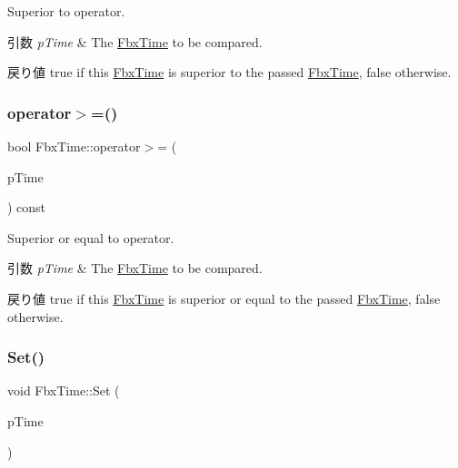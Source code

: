 Superior to operator. 
\begin{DoxyParams}{引数}
{\em p\+Time} & The \hyperlink{class_fbx_time}{Fbx\+Time} to be compared. \\
\hline
\end{DoxyParams}
\begin{DoxyReturn}{戻り値}
{\ttfamily true} if this \hyperlink{class_fbx_time}{Fbx\+Time} is superior to the passed \hyperlink{class_fbx_time}{Fbx\+Time}, {\ttfamily false} otherwise. 
\end{DoxyReturn}
\mbox{\label{class_fbx_time_a58d0eaca01e27c24c35026c9329bf892}} 
\subsubsection{\texorpdfstring{operator$>$=()}{operator>=()}}
{\footnotesize\ttfamily bool Fbx\+Time\+::operator$>$= (\begin{DoxyParamCaption}\item[{const \hyperlink{class_fbx_time}{Fbx\+Time} \&}]{p\+Time }\end{DoxyParamCaption}) const}

Superior or equal to operator. 
\begin{DoxyParams}{引数}
{\em p\+Time} & The \hyperlink{class_fbx_time}{Fbx\+Time} to be compared. \\
\hline
\end{DoxyParams}
\begin{DoxyReturn}{戻り値}
{\ttfamily true} if this \hyperlink{class_fbx_time}{Fbx\+Time} is superior or equal to the passed \hyperlink{class_fbx_time}{Fbx\+Time}, {\ttfamily false} otherwise. 
\end{DoxyReturn}
\mbox{\label{class_fbx_time_ae5d5d3624a3dc7f24fe991f21df4f91b}} 
\subsubsection{\texorpdfstring{Set()}{Set()}}
{\footnotesize\ttfamily void Fbx\+Time\+::\+Set (\begin{DoxyParamCaption}\item[{\hyperlink{fbxtypes_8h_ac34da60c22b0a7e1156e5480da7d71f1}{Fbx\+Long\+Long}}]{p\+Time }\end{DoxyParamCaption})}


